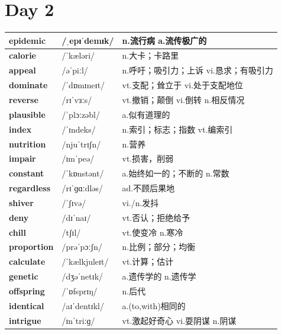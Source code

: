 \documentclass[14pt,a4paper]{extarticle}
\begin{document}
\newpage
\section{Day 2}

\begin{longtable}{ p{} p{} p{} }
\hline
\endfirsthead
\hline
\endhead
\endfoot
\endlastfoot

\textbf{epidemic} & /ˌepɪˈdemɪk/ & n.流行病 \quad a.流传极广的 \\ \hline
\textbf{calorie} & /ˈkæləri/ & n.大卡；卡路里 \\ \hline
\textbf{appeal} & /əˈpiːl/ & n.呼吁；吸引力；上诉 \quad vi.恳求；有吸引力 \\ \hline
\textbf{dominate} & /ˈdɒmɪneɪt/ & vt.支配；耸立于 \quad vi.处于支配地位 \\ \hline
\textbf{reverse} & /rɪˈvɜːs/ & vt.撤销；颠倒 \quad vi.倒转 \quad n.相反情况 \\ \hline
\textbf{plausible} & /ˈplɔːzəbl/ & a.似有道理的 \\ \hline
\textbf{index} & /ˈɪndeks/ & n.索引；标志；指数 \quad vt.编索引 \\ \hline
\textbf{nutrition} & /njuˈtrɪʃn/ & n.营养 \\ \hline
\textbf{impair} & /ɪmˈpeə/ & vt.损害，削弱 \\ \hline
\textbf{constant} & /ˈkɒnstənt/ & a.始终如一的；不断的 \quad n.常数 \\ \hline
\textbf{regardless} & /rɪˈɡɑːdləs/ & ad.不顾后果地 \\ \hline
\textbf{shiver} & /ˈʃɪvə/ & vi./n.发抖 \\ \hline
\textbf{deny} & /dɪˈnaɪ/ & vt.否认；拒绝给予 \\ \hline
\textbf{chill} & /tʃɪl/ & vt.使变冷 \quad n.寒冷 \\ \hline
\textbf{proportion} & /prəˈpɔːʃn/ & n.比例；部分；均衡 \\ \hline
\textbf{calculate} & /ˈkælkjuleɪt/ & vt.计算；估计 \\ \hline
\textbf{genetic} & /dʒəˈnetɪk/ & a.遗传学的 \quad n.遗传学 \\ \hline
\textbf{offspring} & /ˈɒfsprɪŋ/ & n.后代 \\ \hline
\textbf{identical} & /aɪˈdentɪkl/ & a.(to,with)相同的 \\ \hline
\textbf{intrigue} & /ɪnˈtriːɡ/ & vt.激起好奇心 \quad vi.耍阴谋 \quad n.阴谋 \\ \hline

\end{longtable}
\end{document}
